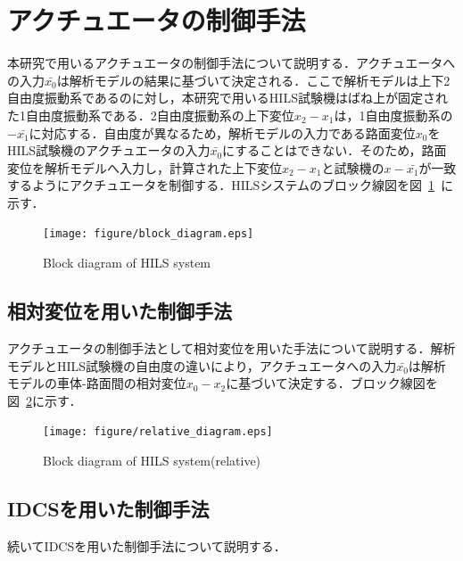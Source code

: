 \documentclass[a4paper,12pt]{article_vdlab_sotsuron}
\begin{document}
\newpage
\section{アクチュエータの制御手法}
本研究で用いるアクチュエータの制御手法について説明する．アクチュエータへの入力$\bar{x_0}$は解析モデルの結果に基づいて決定される．ここで解析モデルは上下2自由度振動系であるのに対し，本研究で用いるHILS試験機はばね上が固定された1自由度振動系である．2自由度振動系の上下変位$x_2-x_1$は，1自由度振動系の$-\bar{x_1}$に対応する．自由度が異なるため，解析モデルの入力である路面変位$x_0$をHILS試験機のアクチュエータの入力$\bar{x_0}$にすることはできない．そのため，路面変位を解析モデルへ入力し，計算された上下変位$x_2-x_1$と試験機の$x-\bar{x_1}$が一致するようにアクチュエータを制御する．HILSシステムのブロック線図を図~\ref{fig:block_diagram}~に示す．

\vspace*{10mm}
\begin{figure}[htp]
  \begin{center}
    \texttt{[image: figure/block\_diagram.eps]}
    \vspace*{3mm}
    \caption{Block diagram of HILS system}
    \label{fig:block_diagram}
  \end{center}
\end{figure}
\newpage

\subsection{相対変位を用いた制御手法}
アクチュエータの制御手法として相対変位を用いた手法について説明する．解析モデルとHILS試験機の自由度の違いにより，アクチュエータへの入力$\bar{x_0}$は解析モデルの車体-路面間の相対変位$x_0-x_2$に基づいて決定する．ブロック線図を図~\ref{fig:relative_diagram}に示す．

\vspace*{10mm}
\begin{figure}[htp]
  \begin{center}
    \texttt{[image: figure/relative\_diagram.eps]}
    \vspace*{3mm}
    \caption{Block diagram of HILS system(relative)}
    \label{fig:relative_diagram}
  \end{center}
\end{figure}
\newpage

\subsection{IDCSを用いた制御手法}
続いてIDCSを用いた制御手法について説明する．
\end{document}
